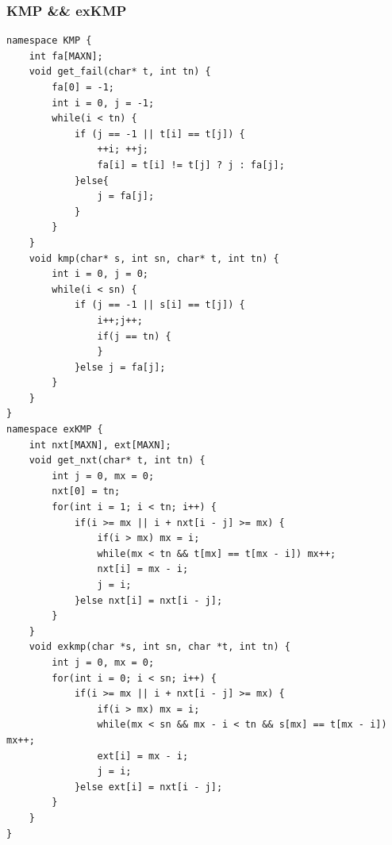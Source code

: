 \documentclass[10pt]{ctexart}
\begin{document}
{\subsubsection{KMP \&\& exKMP}
\begin{lstlisting}
namespace KMP {
	int fa[MAXN];
	void get_fail(char* t, int tn) {
		fa[0] = -1;
		int i = 0, j = -1;
		while(i < tn) {
			if (j == -1 || t[i] == t[j]) {  
				++i; ++j;
				fa[i] = t[i] != t[j] ? j : fa[j];  
			}else{  
				j = fa[j];  
			}  
		}
	}
	void kmp(char* s, int sn, char* t, int tn) {
		int i = 0, j = 0;
		while(i < sn) {
			if (j == -1 || s[i] == t[j]) {
				i++;j++;
				if(j == tn) {
				}
			}else j = fa[j];
		}
	}
}
namespace exKMP {
	int nxt[MAXN], ext[MAXN];
	void get_nxt(char* t, int tn) {
		int j = 0, mx = 0;
		nxt[0] = tn;
		for(int i = 1; i < tn; i++) {
			if(i >= mx || i + nxt[i - j] >= mx) {
				if(i > mx) mx = i;
				while(mx < tn && t[mx] == t[mx - i]) mx++;
				nxt[i] = mx - i;
				j = i;
			}else nxt[i] = nxt[i - j];
		}
	}
	void exkmp(char *s, int sn, char *t, int tn) {
		int j = 0, mx = 0;
		for(int i = 0; i < sn; i++) {
			if(i >= mx || i + nxt[i - j] >= mx) {
				if(i > mx) mx = i;
				while(mx < sn && mx - i < tn && s[mx] == t[mx - i]) mx++;
				ext[i] = mx - i;
				j = i;
			}else ext[i] = nxt[i - j];
		}
	}
}
\end{lstlisting}
}
\end{document}
